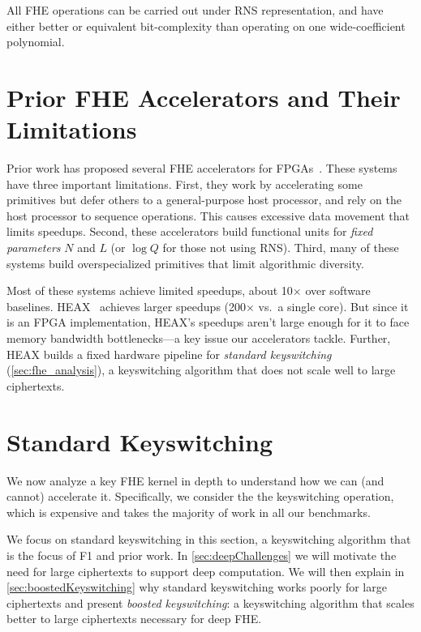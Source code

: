 All FHE operations can be carried out under RNS representation, and have either
better or equivalent bit-complexity than operating on one wide-coefficient
polynomial.

\section{Prior FHE Accelerators and Their Limitations}\label{sec:drawbacks}


Prior work has proposed several FHE accelerators for
FPGAs~\cite{cousins:hpec14:fpga-he,cousins:tetc17:fpga-he,doroz:tc15:accelerating-fhe,roy:hpca19:fpga-he,migliore:tecs17:he-karatsuba,riazi:asplos20:heax,turan:tc20:heaws,mert:tvlsi20:bfv-accel}.
These systems have three important limitations. First, they work by
accelerating some primitives but defer others to a general-purpose host
processor, and rely on the host processor to sequence operations. This causes
excessive data movement that limits speedups. Second, these accelerators build
functional units for \emph{fixed parameters} $N$ and $L$ (or $\log Q$ for those
not using RNS). Third, many of these systems build overspecialized primitives
that limit algorithmic diversity.

Most of these systems achieve limited speedups, about 10$\times$ over software
baselines. HEAX~\cite{riazi:asplos20:heax} achieves larger speedups
(200$\times$ vs.\ a single core). But since it is an FPGA implementation,
HEAX's speedups aren't large enough for it to face memory bandwidth bottlenecks---a
key issue our accelerators tackle. Further, HEAX builds a fixed hardware pipeline
for \emph{standard keyswitching} (\autoref{sec:fhe_analysis}), a keyswitching
algorithm that does not scale well to large ciphertexts.

\section{Standard Keyswitching}
\label{sec:fhe_analysis}

We now analyze a key FHE kernel in depth to understand how we can (and cannot)
accelerate it. Specifically, we consider the the keyswitching
operation, which is expensive and takes the majority of work in all our
benchmarks.

We focus on standard keyswitching in this section, a keyswitching algorithm
that is the focus of F1 and prior work. In \autoref{sec:deepChallenges} we will
motivate the need for large ciphertexts to support deep computation. We will
then explain in \autoref{sec:boostedKeyswitching} why standard keyswitching
works poorly for large ciphertexts and present \emph{boosted keyswitching}: a
keyswitching algorithm that scales better to large ciphertexts necessary for
deep FHE.

